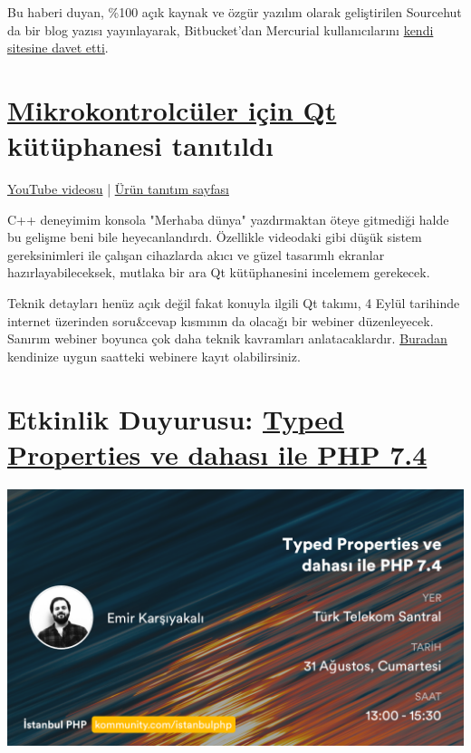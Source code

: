 \documentclass[11pt]{article}
\begin{document}
Bu haberi duyan, \%100 açık kaynak ve özgür yazılım olarak geliştirilen
Sourcehut da bir blog yazısı yayınlayarak, Bitbucket'dan Mercurial
kullanıcılarını \href{https://sourcehut.org/blog/2019-08-21-sourcehut-welcomes-bitbucket-refugees/}{kendi sitesine davet etti}.
\section{\href{https://blog.qt.io/blog/2019/08/21/announcing-qt-mcus/}{Mikrokontrolcüler için Qt} kütüphanesi tanıtıldı}
\label{sec:orgec4859a}
\href{https://www.youtube.com/watch?v=p9\_Qy3kw1wc}{YouTube videosu} |	\href{https://www.qt.io/qt-for-mcu}{Ürün tanıtım sayfası}

C++ deneyimim konsola "Merhaba dünya" yazdırmaktan öteye gitmediği halde bu
gelişme beni bile heyecanlandırdı. Özellikle videodaki gibi düşük sistem
gereksinimleri ile çalışan cihazlarda akıcı ve güzel tasarımlı ekranlar
hazırlayabileceksek, mutlaka bir ara Qt kütüphanesini incelemem gerekecek.

Teknik detayları henüz açık değil fakat konuyla ilgili Qt takımı, 4 Eylül
tarihinde internet üzerinden soru\&cevap kısmının da olacağı bir webiner
düzenleyecek. Sanırım webiner boyunca çok daha teknik kavramları
anlatacaklardır. \href{https://www.qt.io/qt-for-mcu\#MCUWebinar}{Buradan} kendinize uygun saatteki webinere kayıt
olabilirsiniz.
\section{Etkinlik Duyurusu: \href{https://kommunity.com/istanbulphp/events/typed-properties-ve-dahasi-ile-php-74}{Typed Properties ve dahası ile PHP 7.4}}
\label{sec:org0ed109b}
\begin{center}
\includegraphics[width=.9\linewidth]{gorseller/php-etkinligi.png}
\end{center}
\end{document}
